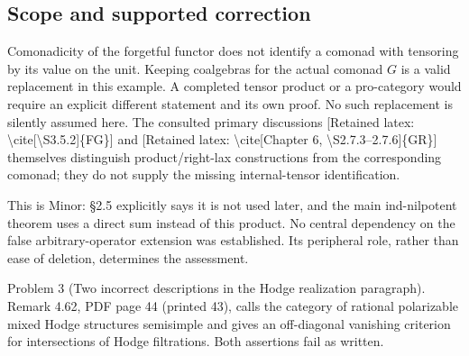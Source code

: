 \documentclass[10pt]{article}
\begin{document}
\subsection*{Scope and supported correction}
Comonadicity of the forgetful functor does not identify a comonad with tensoring by its value on the unit. Keeping coalgebras for the actual comonad \(G\) is a valid replacement in this example. A completed tensor product or a pro-category would require an explicit different statement and its own proof. No such replacement is silently assumed here. The consulted primary discussions [Retained latex: \textbackslash{}cite[\textbackslash{}S3.5.2]\{FG\}] and [Retained latex: \textbackslash{}cite[Chapter 6, \textbackslash{}S2.7.3--2.7.6]\{GR\}] themselves distinguish product/right-lax constructions from the corresponding comonad; they do not supply the missing internal-tensor identification.\par
This is Minor: §2.5 explicitly says it is not used later, and the main ind-nilpotent theorem uses a direct sum instead of this product. No central dependency on the false arbitrary-operator extension was established. Its peripheral role, rather than ease of deletion, determines the assessment.\par
Problem 3 (Two incorrect descriptions in the Hodge realization paragraph).  Remark 4.62, PDF page 44 (printed 43), calls the category of rational polarizable mixed Hodge structures semisimple and gives an off-diagonal vanishing criterion for intersections of Hodge filtrations. Both assertions fail as written.\par
\end{document}
